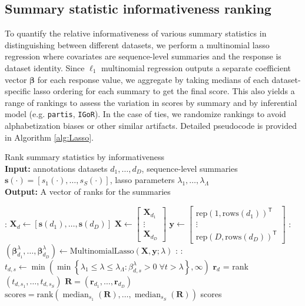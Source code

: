 \documentclass{article}
\newcommand{\partis}{\texttt{partis}}
\newcommand{\igor}{\texttt{IGoR}}
\newcommand{\median}{\operatorname{median}}
\begin{document}
\subsection*{Summary statistic informativeness ranking}
To quantify the relative informativeness of various summary statistics in distinguishing between different datasets, we perform a multinomial lasso regression where covariates are sequence-level summaries and the response is dataset identity.
Since $\ell_1$ multinomial regression outputs a separate coefficient vector $\boldsymbol \beta$ for each response value, we aggregate by taking medians of each dataset-specific lasso ordering for each summary to get the final score.
This also yields a range of rankings to assess the variation in scores by summary and by inferential model (e.g. \partis, \igor).
In the case of ties, we randomize rankings to avoid alphabetization biases or other similar artifacts.
Detailed pseudocode is provided in Algorithm \ref{alg:Lasso}.
\begin{algorithm}
    \caption{Rank summary statistics by informativeness\\
        \textbf{Input:} annotations datasets $d_1, \dotsc, d_D$, sequence-level summaries $\mathbf s(\cdot) = [s_1(\cdot), \dotsc, s_S(\cdot)]$, lasso parameters $\lambda_1, \dotsc, \lambda_\Lambda$ \\
        \textbf{Output:} A vector of ranks for the summaries }
    \label{alg:Lasso}
    \begin{algorithmic}
   		:
			\State $\mathbf X_d \gets [\mathbf s(d_1), \dotsc, \mathbf s(d_D)]$
    	\EndFor
		\State $\mathbf X \gets \begin{bmatrix}
			 \mathbf X_{d_1} \\ \vdots \\ \mathbf X_{d_D}
			 \end{bmatrix}$
		\State $\mathbf y \gets \begin{bmatrix}
			\text{rep}(1, \text{rows}(d_1))^\mathsf{T}
			\\ \vdots \\
			\text{rep}(D, \text{rows}(d_D))^\mathsf{T}
		\end{bmatrix}$
        :
        	\State $(\boldsymbol \beta_{d_1}^\lambda, \dotsc, \boldsymbol \beta_{d_D}^\lambda) \gets \text{MultinomialLasso}(\mathbf X, \mathbf y; \lambda)$
        \EndFor
        :
        	:
				\State $t_{d, s} \gets
				\min\left( \min \left\{ \lambda_1 \le \lambda \le \lambda_\Lambda: \beta_{d, s}^\lambda > 0 \;
					\forall t > \lambda \right\},
					\infty \right)$
			\EndFor
			\State $\mathbf r_d$ = rank$(t_{d, s_1}, \dotsc, t_{d, s_S})$
        \EndFor
        \State $\mathbf R = (\mathbf r_{d_1}, \dotsc, \mathbf r_{d_D})$
        \State $\text{scores} = \text{rank}\left( \median_{s_1}(\mathbf R),
        	 \dotsc, \median_{s_S}(\mathbf R) \right)$
       \State \Return scores
    \end{algorithmic}
\end{algorithm}
\end{document}
